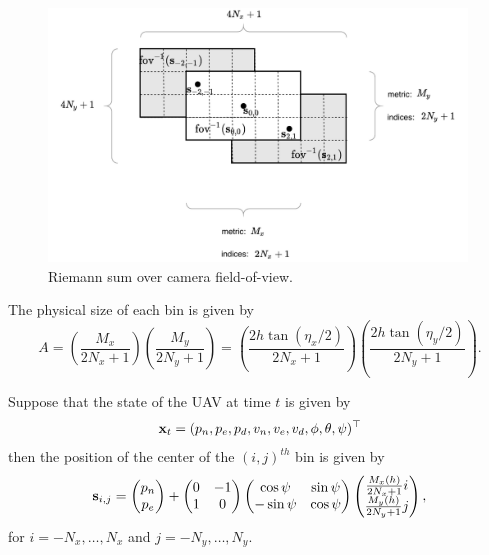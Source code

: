 \begin{figure}[hbt]
  \centering\includegraphics[width=0.99\textwidth]{./chap5_trajectory_planning/figures/riemann_sum}
  \caption{Riemann sum over camera field-of-view.}
  \label{fig:riemann_sum}  
\end{figure}
The physical size of each bin is given by
\[
	A = \left(\frac{M_x}{2N_x+1}\right)\left(\frac{M_y}{2N_y+1}\right)
	  = \left(\frac{2h\tan(\eta_x/2)}{2N_x+1}\right)\left(\frac{2h\tan(\eta_y/2)}{2N_y+1}\right).
\]

Suppose that the state of the UAV at time $t$ is given by
\[
\mathbf{x}_t = (p_n, p_e, p_d, v_n, v_e, v_d, \phi, \theta, \psi)^\top
\]
then the position of the center of the $(i,j)^{th}$ bin is given by
\[
\mathbf{s}_{i,j} = \begin{pmatrix} p_n \\ p_e \end{pmatrix} + \begin{pmatrix} 0 & -1 \\ 1 & 0 \end{pmatrix} \begin{pmatrix}\cos\psi & \sin\psi \\ -\sin\psi & \cos\psi \end{pmatrix}\begin{pmatrix} \frac{M_x(h)}{2N_x+1} i \\ \frac{M_y(h)}{2N_y+1} j \end{pmatrix}, 
\]
for $i=-N_x, \dots, N_x$ and $j=-N_y, \dots, N_y$.  

